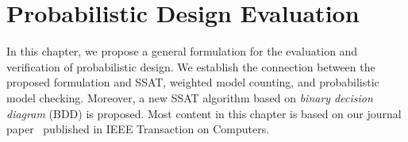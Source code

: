\chapter{Probabilistic Design Evaluation}
\label{chap:prob-design-eval}

In this chapter, we propose a general formulation for the evaluation and verification of probabilistic design.
We establish the connection between the proposed formulation and SSAT, weighted model counting, and probabilistic model checking.
Moreover, a new SSAT algorithm based on \textit{binary decision diagram} (BDD) is proposed.
Most content in this chapter is based on our journal paper~\cite{LeeTC18ProbDesign} published in IEEE Transaction on Computers.





